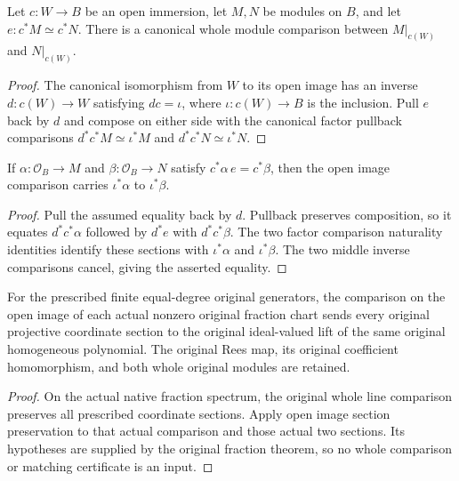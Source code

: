 \begin{definition}
\label{def:whole-module-open-image-comparison}
\leanok
{}
Let $c:W\to B$ be an open immersion, let $M,N$ be modules on $B$, and let $e:c^*M\simeq c^*N$. There is a canonical whole module comparison between $M|_{c(W)}$ and $N|_{c(W)}$.
\end{definition}
\begin{proof}
The canonical isomorphism from $W$ to its open image has an inverse $d:c(W)\to W$ satisfying $dc=\iota$, where $\iota:c(W)\to B$ is the inclusion. Pull $e$ back by $d$ and compose on either side with the canonical factor pullback comparisons $d^*c^*M\simeq\iota^*M$ and $d^*c^*N\simeq\iota^*N$.
\end{proof}

\begin{proposition}
\label{prop:whole-module-open-image-sections}
\leanok
{}
If $\alpha:\mathcal O_B\to M$ and $\beta:\mathcal O_B\to N$ satisfy $c^*\alpha\,e=c^*\beta$, then the open image comparison carries $\iota^*\alpha$ to $\iota^*\beta$.
\end{proposition}
\begin{proof}
Pull the assumed equality back by $d$. Pullback preserves composition, so it equates $d^*c^*\alpha$ followed by $d^*e$ with $d^*c^*\beta$. The two factor comparison naturality identities identify these sections with $\iota^*\alpha$ and $\iota^*\beta$. The two middle inverse comparisons cancel, giving the asserted equality.
\end{proof}

\begin{proposition}
\label{prop:whole-original-fraction-open-image-sections}
\leanok
{}
For the prescribed finite equal-degree original generators, the comparison on the open image of each actual nonzero original fraction chart sends every original projective coordinate section to the original ideal-valued lift of the same original homogeneous polynomial. The original Rees map, its original coefficient homomorphism, and both whole original modules are retained.
\end{proposition}
\begin{proof}
On the actual native fraction spectrum, the original whole line comparison preserves all prescribed coordinate sections. Apply open image section preservation to that actual comparison and those actual two sections. Its hypotheses are supplied by the original fraction theorem, so no whole comparison or matching certificate is an input.
\end{proof}
